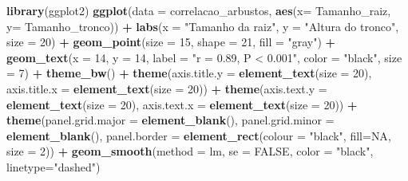 \documentclass[
]{book}
\newenvironment{Shaded}{\begin{snugshade}}{\end{snugshade}}
\newcommand{\DataTypeTok}[1]{\textcolor[rgb]{0.13,0.29,0.53}{#1}}
\newcommand{\DecValTok}[1]{\textcolor[rgb]{0.00,0.00,0.81}{#1}}
\newcommand{\KeywordTok}[1]{\textcolor[rgb]{0.13,0.29,0.53}{\textbf{#1}}}
\newcommand{\NormalTok}[1]{#1}
\newcommand{\OperatorTok}[1]{\textcolor[rgb]{0.81,0.36,0.00}{\textbf{#1}}}
\newcommand{\OtherTok}[1]{\textcolor[rgb]{0.56,0.35,0.01}{#1}}
\newcommand{\StringTok}[1]{\textcolor[rgb]{0.31,0.60,0.02}{#1}}
\begin{document}
\begin{Shaded}
\begin{Highlighting}[]
\KeywordTok{library}\NormalTok{(ggplot2)}
\KeywordTok{ggplot}\NormalTok{(}\DataTypeTok{data =}\NormalTok{ correlacao_arbustos, }\KeywordTok{aes}\NormalTok{(}\DataTypeTok{x=}\NormalTok{ Tamanho_raiz, }\DataTypeTok{y=}\NormalTok{ Tamanho_tronco)) }\OperatorTok{+}\StringTok{ }
\StringTok{  }\KeywordTok{labs}\NormalTok{(}\DataTypeTok{x =} \StringTok{"Tamanho da raiz"}\NormalTok{, }\DataTypeTok{y =} \StringTok{"Altura do tronco"}\NormalTok{, }\DataTypeTok{size =} \DecValTok{20}\NormalTok{) }\OperatorTok{+}
\StringTok{  }\KeywordTok{geom_point}\NormalTok{(}\DataTypeTok{size =} \DecValTok{15}\NormalTok{, }\DataTypeTok{shape =} \DecValTok{21}\NormalTok{, }\DataTypeTok{fill =} \StringTok{"gray"}\NormalTok{) }\OperatorTok{+}
\StringTok{  }\KeywordTok{geom_text}\NormalTok{(}\DataTypeTok{x =} \DecValTok{14}\NormalTok{, }\DataTypeTok{y =} \DecValTok{14}\NormalTok{, }\DataTypeTok{label =} \StringTok{"r = 0.89, P < 0.001"}\NormalTok{, }\DataTypeTok{color =} \StringTok{"black"}\NormalTok{, }\DataTypeTok{size =} \DecValTok{7}\NormalTok{) }\OperatorTok{+}
\StringTok{  }\KeywordTok{theme_bw}\NormalTok{() }\OperatorTok{+}
\StringTok{  }\KeywordTok{theme}\NormalTok{(}\DataTypeTok{axis.title.y =} \KeywordTok{element_text}\NormalTok{(}\DataTypeTok{size =} \DecValTok{20}\NormalTok{), }\DataTypeTok{axis.title.x =} \KeywordTok{element_text}\NormalTok{(}\DataTypeTok{size =} \DecValTok{20}\NormalTok{)) }\OperatorTok{+}
\StringTok{  }\KeywordTok{theme}\NormalTok{(}\DataTypeTok{axis.text.y =} \KeywordTok{element_text}\NormalTok{(}\DataTypeTok{size =} \DecValTok{20}\NormalTok{), }\DataTypeTok{axis.text.x =} \KeywordTok{element_text}\NormalTok{(}\DataTypeTok{size =} \DecValTok{20}\NormalTok{)) }\OperatorTok{+}
\StringTok{  }\KeywordTok{theme}\NormalTok{(}\DataTypeTok{panel.grid.major =} \KeywordTok{element_blank}\NormalTok{(), }\DataTypeTok{panel.grid.minor =} \KeywordTok{element_blank}\NormalTok{(), }
        \DataTypeTok{panel.border =} \KeywordTok{element_rect}\NormalTok{(}\DataTypeTok{colour =} \StringTok{"black"}\NormalTok{, }\DataTypeTok{fill=}\OtherTok{NA}\NormalTok{, }\DataTypeTok{size =} \DecValTok{2}\NormalTok{)) }\OperatorTok{+}
\StringTok{  }\KeywordTok{geom_smooth}\NormalTok{(}\DataTypeTok{method =}\NormalTok{ lm, }\DataTypeTok{se =} \OtherTok{FALSE}\NormalTok{, }\DataTypeTok{color =} \StringTok{"black"}\NormalTok{, }\DataTypeTok{linetype=}\StringTok{"dashed"}\NormalTok{) }
\end{Highlighting}
\end{Shaded}
\end{document}
